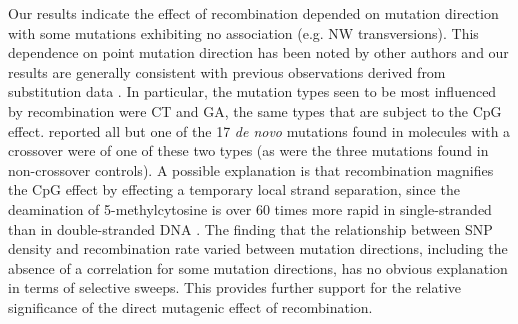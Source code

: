 Our results indicate the effect of recombination depended on mutation direction with some mutations exhibiting no association (e.g. N\textrightarrow W transversions).  This dependence on point mutation direction has been noted by other authors and our results are generally consistent with previous observations derived from substitution data \citep{Duret_2008}. In particular, the mutation types seen to be most influenced by recombination were C\textrightarrow T and G\textrightarrow A, the same types that are subject to the CpG effect.  \citet{Arbeithuber_Crossovers_2015} reported all but one of the 17 \textit{de novo} mutations found in molecules with a crossover were of one of these two types (as were the three mutations found in non-crossover controls).  A possible explanation is that recombination magnifies the CpG effect by effecting a temporary local strand separation, since the deamination of 5-methylcytosine is over 60 times more rapid in single-stranded than in double-stranded DNA \citep{ehrlich1986dna, zhang1994effect}. The finding that the relationship between SNP density and recombination rate varied between mutation directions, including the absence of a correlation for some mutation directions, has no obvious explanation in terms of selective sweeps. This provides further support for the relative significance of the direct mutagenic effect of recombination.

